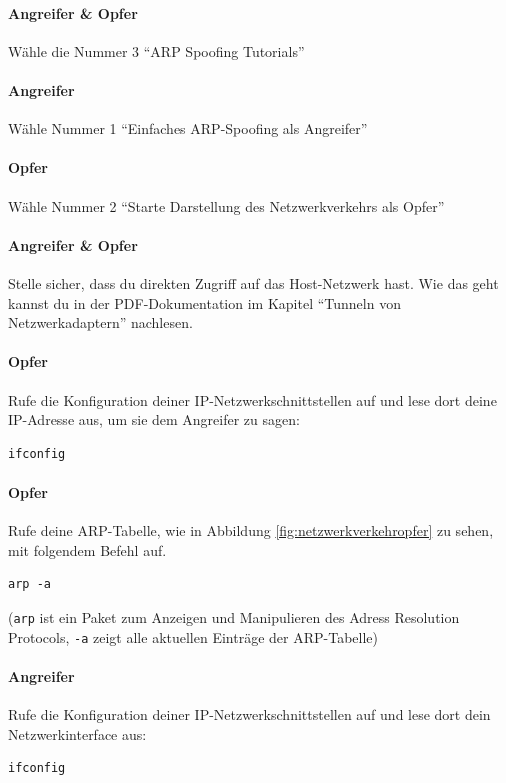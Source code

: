 \paragraph{Angreifer \& Opfer} Wähle die Nummer 3 \enquote{ARP Spoofing Tutorials}

\paragraph{Angreifer} Wähle Nummer 1 \enquote{Einfaches ARP-Spoofing als Angreifer}

\paragraph{Opfer} Wähle Nummer 2 \enquote{Starte Darstellung des Netzwerkverkehrs als Opfer}

\paragraph{Angreifer \& Opfer} Stelle sicher, dass du direkten Zugriff auf das Host-Netzwerk hast. Wie das geht kannst du in der PDF-Dokumentation im Kapitel \enquote{Tunneln von Netzwerkadaptern} nachlesen.

\paragraph{Opfer} Rufe die Konfiguration deiner IP-Netzwerkschnittstellen auf und lese dort deine IP-Adresse aus, um sie dem Angreifer zu sagen:
\begin{lstlisting}
ifconfig
\end{lstlisting}

\paragraph{Opfer} Rufe deine ARP-Tabelle, wie in Abbildung \ref{fig:netzwerkverkehropfer} zu sehen, mit folgendem Befehl auf.
\begin{lstlisting}
arp -a
\end{lstlisting}
(\colorbox{altgray}{\lstinline|arp|} ist ein Paket zum Anzeigen und Manipulieren des Adress Resolution Protocols, \colorbox{altgray}{\lstinline|-a|} zeigt alle aktuellen Einträge der ARP-Tabelle)

\paragraph{Angreifer} Rufe die Konfiguration deiner IP-Netzwerkschnittstellen auf und lese dort dein Netzwerkinterface aus:
\begin{lstlisting}
ifconfig
\end{lstlisting}

